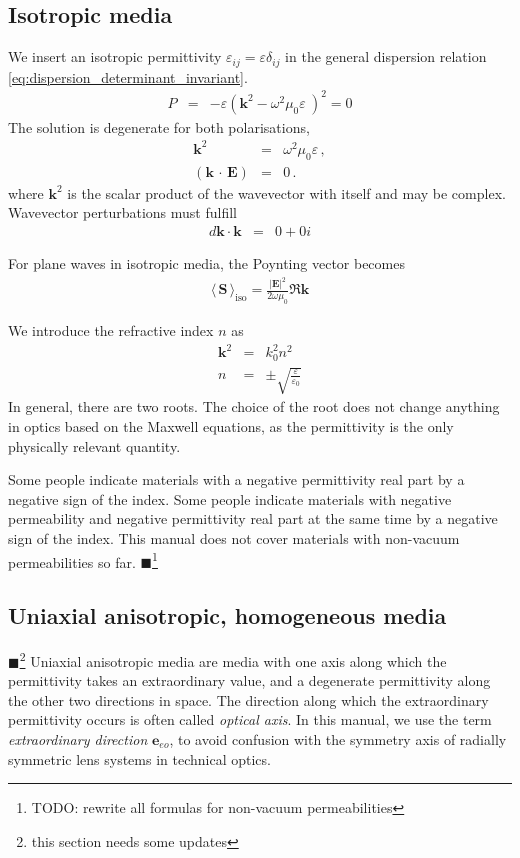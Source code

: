 \documentclass[12pt,a4paper,twoside,openright,BCOR10mm,headsepline,titlepage,abstracton,chapterprefix,final]{scrreprt}
\newcommand\Vector[1]{{\mathbf{#1}}}
\newcommand\vacuum{0}
\newcommand\wavenumber{k}
\newcommand\Wavevector{\Vector{\wavenumber}}
\newcommand{\scpm}[2]{(#1\,\cdot\,#2)}
\newcommand\scalarEfield{E}
\newcommand\Efield{\Vector{\scalarEfield}}
\newcommand\vacuumpermeability{\scalarpermeability_{\vacuum}}
\newcommand\scalarpermeability{\mu}
\newcommand\vacuumpermittivity{\scalarpermittivity_{\vacuum}}
\newcommand\scalarpermittivity{\varepsilon}
\newcommand{\timeavg}[1]{{\langle\,#1\,\rangle}}
\newcommand{\remark}[1]{{\color{red}$\blacksquare$}\footnote{{\color{red}#1}}}
\begin{document}
\subsection{Isotropic media}
We insert an isotropic permittivity $\scalarpermittivity_{ij} = \scalarpermittivity \delta_{ij}$ 
in the general dispersion relation \eqref{eq:dispersion_determinant_invariant}.
\begin{eqnarray}
 P &=& -\scalarpermittivity 
       \left( 
         \Wavevector^2 - \omega^2 \vacuumpermeability \scalarpermittivity\
       \right)^2
    = 0
\end{eqnarray}
The solution is degenerate for both polarisations,
\begin{eqnarray}
 \Wavevector^2 &=& \omega^2 \vacuumpermeability \scalarpermittivity\,, \\
 \scpm{\Wavevector}{\Efield} &=& 0\,.
\end{eqnarray}
where $\Wavevector^2$ is the scalar product of the wavevector with itself and may be complex.
Wavevector perturbations must fulfill
\begin{eqnarray}
 d\Wavevector \cdot \Wavevector &=& 0 + 0i
\end{eqnarray}

For plane waves in isotropic media, the Poynting vector becomes 
\begin{eqnarray}
 \timeavg{\Vector{S}}_\text{iso} = \frac{ |\Efield|^2 }{ 2\omega\vacuumpermeability } \Re \Wavevector
\end{eqnarray}

We introduce the refractive index $n$ as
\begin{eqnarray}
 \Wavevector^2 &=& k_0^2 n^2 \\
 n &=& \pm \sqrt{ \frac{\scalarpermittivity}{\vacuumpermittivity} }
\end{eqnarray}
In general, there are two roots. 
The choice of the root does not change anything in optics based on the Maxwell equations, as the permittivity is the only physically relevant quantity.

Some people indicate materials with a negative permittivity real part by a negative sign of the index.
Some people indicate materials with negative permeability and negative permittivity real part at the same time by a negative sign of the index.
This manual does not cover materials with non-vacuum permeabilities so far.
\remark{TODO: rewrite all formulas for non-vacuum permeabilities}



\subsection{Uniaxial anisotropic, homogeneous media}
\remark{this section needs some updates}
Uniaxial anisotropic media are media with one axis along which the permittivity takes an extraordinary value, 
and a degenerate permittivity along the other two directions in space.
The direction along which the extraordinary permittivity occurs is often called \emph{optical axis}. 
In this manual, we use the term \emph{extraordinary direction} $\Vector{e}_{eo}$, to avoid confusion with the symmetry axis of radially symmetric lens systems in technical optics.
\end{document}
